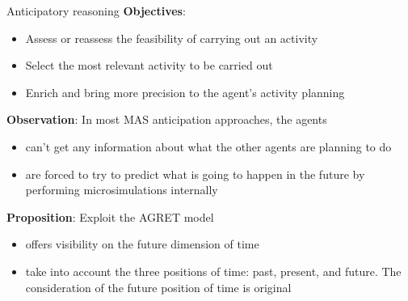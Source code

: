 \begin{frame}{Anticipatory reasoning}
\textbf{Objectives}:
\begin{itemize}
    \item Assess or reassess the feasibility of carrying out an activity
    \item Select the most relevant activity to be carried out
    \item Enrich and bring more precision to the agent's activity planning
\end{itemize}
\vspace{.3cm}
\par \textbf{Observation}: In most MAS anticipation approaches, the agents
\begin{itemize}
    \item can't get any information about what the other agents are planning to do
    \item are forced to try to predict what is going to happen in the future by performing microsimulations internally
\end{itemize}
\vspace{.3cm}
\par \textbf{Proposition}: Exploit the AGRET model
\begin{itemize}
    \item offers visibility on the future dimension of time
    \item take into account the three positions of time: past, present, and future. \alert{The consideration of the future position of time is original}
\end{itemize}


\end{frame}
